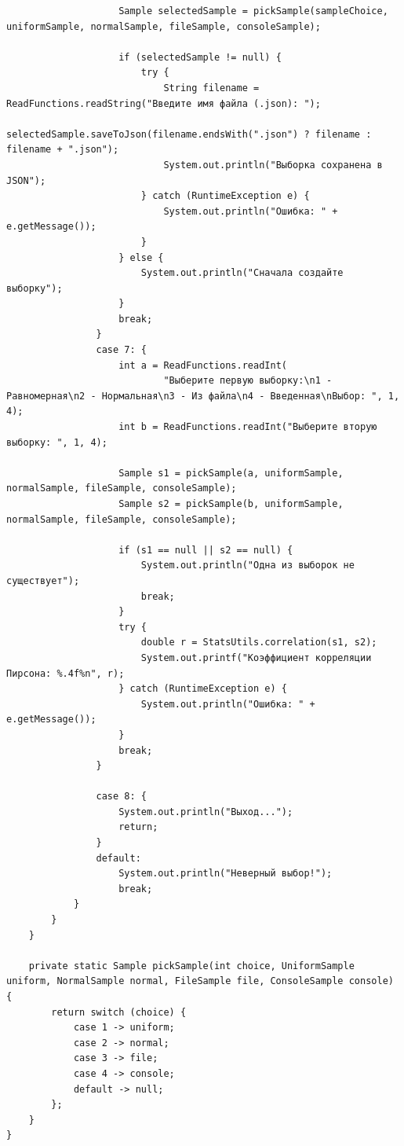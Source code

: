 \begin{verbatim}
                    Sample selectedSample = pickSample(sampleChoice, uniformSample, normalSample, fileSample, consoleSample);

                    if (selectedSample != null) {
                        try {
                            String filename = ReadFunctions.readString("Введите имя файла (.json): ");
                            selectedSample.saveToJson(filename.endsWith(".json") ? filename : filename + ".json");
                            System.out.println("Выборка сохранена в JSON");
                        } catch (RuntimeException e) {
                            System.out.println("Ошибка: " + e.getMessage());
                        }
                    } else {
                        System.out.println("Сначала создайте выборку");
                    }
                    break;
                }
                case 7: {
                    int a = ReadFunctions.readInt(
                            "Выберите первую выборку:\n1 - Равномерная\n2 - Нормальная\n3 - Из файла\n4 - Введенная\nВыбор: ", 1, 4);
                    int b = ReadFunctions.readInt("Выберите вторую выборку: ", 1, 4);

                    Sample s1 = pickSample(a, uniformSample, normalSample, fileSample, consoleSample);
                    Sample s2 = pickSample(b, uniformSample, normalSample, fileSample, consoleSample);

                    if (s1 == null || s2 == null) {
                        System.out.println("Одна из выборок не существует");
                        break;
                    }
                    try {
                        double r = StatsUtils.correlation(s1, s2);
                        System.out.printf("Коэффициент корреляции Пирсона: %.4f%n", r);
                    } catch (RuntimeException e) {
                        System.out.println("Ошибка: " + e.getMessage());
                    }
                    break;
                }

                case 8: {
                    System.out.println("Выход...");
                    return;
                }
                default:
                    System.out.println("Неверный выбор!");
                    break;
            }
        }
    }

    private static Sample pickSample(int choice, UniformSample uniform, NormalSample normal, FileSample file, ConsoleSample console) {
        return switch (choice) {
            case 1 -> uniform;
            case 2 -> normal;
            case 3 -> file;
            case 4 -> console;
            default -> null;
        };
    }
}


\end{verbatim}
